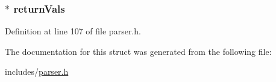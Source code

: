 \hypertarget{structfunction__return__ast__node_affc2b618d4e05bd2a134699a48a5b06f}{
\subsubsection[{return\+Vals}]{$\ast$ return\+Vals}}\label{structfunction__return__ast__node_affc2b618d4e05bd2a134699a48a5b06f}


Definition at line 107 of file parser.\+h.



The documentation for this struct was generated from the following file\+:\begin{DoxyCompactItemize}
\item 
includes/\hyperlink{parser_8h}{parser.\+h}\end{DoxyCompactItemize}
